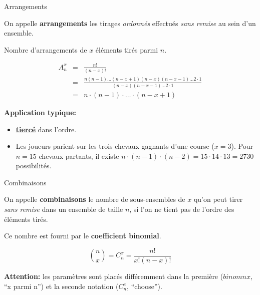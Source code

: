 \documentclass[ignorenonframetext,]{beamer}
\begin{document}
\begin{frame}{Arrangements}
\protect\hypertarget{arrangements}{}

On appelle \textbf{arrangements} les tirages \emph{ordonnés} effectués
\emph{sans remise} au sein d'un ensemble.

Nombre d'arrangements de \(x\) éléments tirés parmi \(n\).

\[\begin{array}{ccl}
A^x_n & = & \frac{n!}{(n - x)!} \\
 & = & \frac{n(n-1) \ldots (n-x +1) (n - x) (n-x-1) \ldots 2 \cdot 1}{(n - x) (n-x-1) \ldots 2 \cdot 1} \\
& = & n \cdot (n-1) \cdot \ldots \cdot (n-x+1)
\end{array}
\]

\textbf{Application typique:}

\begin{itemize}
\item
  \textbf{\href{https://fr.wikipedia.org/wiki/Tierc\%C3\%A9_(jeu)}{tiercé}}
  dans l'ordre.
\item
  Les joueurs parient sur les trois chevaux gagnants d'une course
  (\(x=3\)). Pour \(n=15\) chevaux partants, il existe
  \(n \cdot (n-1) \cdot (n-2) = 15 \cdot 14 \cdot 13 = 2730\)
  possibilités.
\end{itemize}

\end{frame}

\begin{frame}{Combinaisons}
\protect\hypertarget{combinaisons}{}

On appelle \textbf{combinaisons} le nombre de sous-ensembles de \(x\)
qu'on peut tirer \emph{sans remise} dans un ensemble de taille \(n\), si
l'on ne tient pas de l'ordre des éléments tirés.

Ce nombre est fourni par le \textbf{coefficient binomial}.

\[\binom{n}{x} = C^x_n = \frac{n!}{x! (n-x)!}\]

\textbf{Attention: } les paramètres sont placés différemment dans la
première (\(binom{n}{x}\), ``x parmi n'') et la seconde notation
(\(C^x_n\), ``choose'').

\end{frame}
\end{document}
